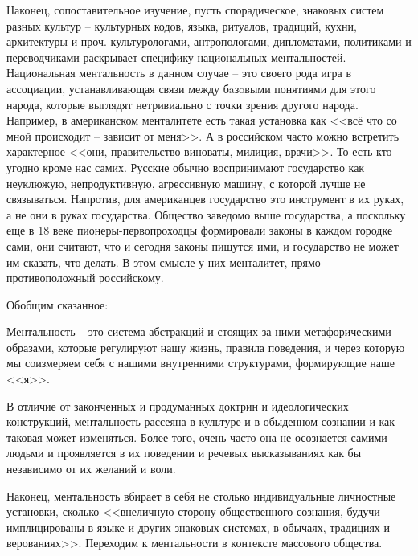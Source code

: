 Наконец, сопоставительное изучение, пусть спорадическое, знаковых систем разных культур -- культурных кодов,
языка, ритуалов, традиций, кухни, архитектуры и проч. культурологами, антропологами, дипломатами,
политиками и переводчиками раскрывает специфику национальных ментальностей. Национальная ментальность
в данном случае -- это своего рода игра в ассоциации, устанавливающая связи между бaзoвыми понятиями
для этого народа, которые выглядят нетривиально с точки зрения другого народа.
Например, в американском менталитете есть такая установка как <<всё что со мной происходит -- зависит от меня>>.
А в российском часто можно встретить характерное <<они, правительство виноваты, милиция, врачи>>.
То есть кто угодно кроме нас самих. Русские обычно воспринимают государство как неуклюжую, непродуктивную,
агрессивную машину, с которой лучше не связываться. Напротив, для американцев государство это инструмент в
их руках, а не они в руках государства. Общество заведомо выше государства, а поскольку еще в 18 веке
пионеры-первопроходцы формировали законы в каждом городке сами, они считают, что и сегодня законы пишутся
ими, и государство не может им сказать, что делать. В этом смысле у них менталитет, прямо
противоположный российскому.

Обобщим сказанное:

Ментальность -- это система абстракций и стоящих за ними метафорическими образами,
которые регулируют нашу жизнь, правила поведения, и через которую мы соизмеряем себя
с нашими внутренними структурами, формирующие наше <<я>>.

В отличие от законченных и продуманных доктрин и идеологических конструкций, ментальность
рассеяна в культуре и в обыденном сознании и как таковая может изменяться.
Более того, очень часто она не осознается самими людьми и проявляется в их поведении
и речевых высказываниях как бы независимо от их желаний и воли.

Наконец, ментальность вбирает в себя не столько индивидуальные личностные установки,
сколько <<внеличную сторону общественного сознания, будучи имплицированы в языке и
других знаковых системах, в обычаях, традициях и верованиях>>\autocite{gurevich_history}. Переходим к ментальности в контексте массового общества.

